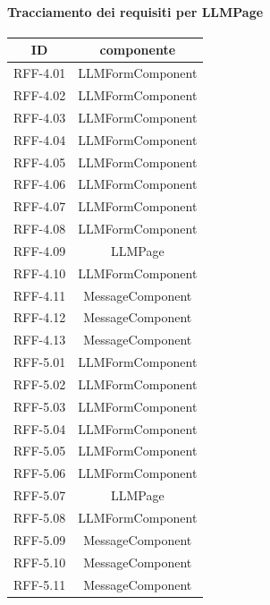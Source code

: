 \paragraph{Tracciamento dei requisiti per LLMPage}
\begin{tabularx}{\textwidth}{|c|c|}
    \hline
    \textbf{ID} & \textbf{componente} \\
    \hline
        RFF-4.01 & LLMFormComponent \\
    \hline
        RFF-4.02 & LLMFormComponent \\
    \hline
        RFF-4.03 & LLMFormComponent \\
    \hline
        RFF-4.04 & LLMFormComponent \\
    \hline
        RFF-4.05 & LLMFormComponent \\
    \hline
        RFF-4.06 & LLMFormComponent \\
    \hline
        RFF-4.07 & LLMFormComponent \\
    \hline
        RFF-4.08 & LLMFormComponent \\
    \hline
        RFF-4.09 & LLMPage \\
    \hline
        RFF-4.10 & LLMFormComponent \\
    \hline
        RFF-4.11 & MessageComponent \\
    \hline
        RFF-4.12 & MessageComponent \\
    \hline
        RFF-4.13 & MessageComponent \\
    \hline
        RFF-5.01 & LLMFormComponent \\
    \hline
        RFF-5.02 & LLMFormComponent \\
    \hline
        RFF-5.03 & LLMFormComponent \\
    \hline
        RFF-5.04 & LLMFormComponent \\
    \hline
        RFF-5.05 & LLMFormComponent \\
    \hline
        RFF-5.06 & LLMFormComponent \\
    \hline
        RFF-5.07 & LLMPage \\
    \hline
        RFF-5.08 & LLMFormComponent \\
    \hline
        RFF-5.09 & MessageComponent \\
    \hline
        RFF-5.10 & MessageComponent \\
    \hline
        RFF-5.11 & MessageComponent \\
    \hline
\end{tabularx} 